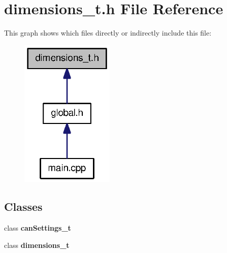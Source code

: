 \section{dimensions\-\_\-t.\-h \-File \-Reference}
\label{dimensions__t_8h}
\-This graph shows which files directly or indirectly include this file\-:
\nopagebreak
\begin{figure}[H]
\begin{center}
\leavevmode
\includegraphics[width=126pt]{dimensions__t_8h__dep__incl}
\end{center}
\end{figure}
\subsection*{\-Classes}
\begin{DoxyCompactItemize}
\item 
class {\bf can\-Settings\-\_\-t}
\item 
class {\bf dimensions\-\_\-t}
\end{DoxyCompactItemize}
